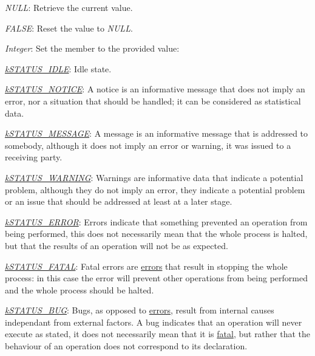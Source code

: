 \begin{DoxyItemize}
\item {\itshape N\-U\-L\-L}\-: Retrieve the current value. 
\item {\itshape F\-A\-L\-S\-E}\-: Reset the value to {\itshape N\-U\-L\-L}. 
\item {\itshape Integer}\-: Set the member to the provided value\-: 
\begin{DoxyItemize}
\item {\itshape \hyperlink{}{k\-S\-T\-A\-T\-U\-S\-\_\-\-I\-D\-L\-E}}\-: Idle state. 
\item {\itshape \hyperlink{}{k\-S\-T\-A\-T\-U\-S\-\_\-\-N\-O\-T\-I\-C\-E}}\-: A notice is an informative message that does not imply an error, nor a situation that should be handled; it can be considered as statistical data. 
\item {\itshape \hyperlink{}{k\-S\-T\-A\-T\-U\-S\-\_\-\-M\-E\-S\-S\-A\-G\-E}}\-: A message is an informative message that is addressed to somebody, although it does not imply an error or warning, it was issued to a receiving party. 
\item {\itshape \hyperlink{}{k\-S\-T\-A\-T\-U\-S\-\_\-\-W\-A\-R\-N\-I\-N\-G}}\-: Warnings are informative data that indicate a potential problem, although they do not imply an error, they indicate a potential problem or an issue that should be addressed at least at a later stage. 
\item {\itshape \hyperlink{}{k\-S\-T\-A\-T\-U\-S\-\_\-\-E\-R\-R\-O\-R}}\-: Errors indicate that something prevented an operation from being performed, this does not necessarily mean that the whole process is halted, but that the results of an operation will not be as expected. 
\item {\itshape \hyperlink{}{k\-S\-T\-A\-T\-U\-S\-\_\-\-F\-A\-T\-A\-L}}\-: Fatal errors are \hyperlink{}{errors} that result in stopping the whole process\-: in this case the error will prevent other operations from being performed and the whole process should be halted. 
\item {\itshape \hyperlink{}{k\-S\-T\-A\-T\-U\-S\-\_\-\-B\-U\-G}}\-: Bugs, as opposed to \hyperlink{}{errors}, result from internal causes independant from external factors. A bug indicates that an operation will never execute as stated, it does not necessarily mean that it is \hyperlink{}{fatal}, but rather that the behaviour of an operation does not correspond to its declaration. 
\end{DoxyItemize}
\end{DoxyItemize}

